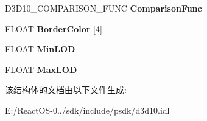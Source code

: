 \begin{DoxyCompactItemize}
D3\+D10\+\_\+\+C\+O\+M\+P\+A\+R\+I\+S\+O\+N\+\_\+\+F\+U\+NC {\bfseries Comparison\+Func}
\item 
\mbox{\label{struct_d3_d10___s_a_m_p_l_e_r___d_e_s_c_ab23ac77c31d4f36c23267bb166c38543}} 
F\+L\+O\+AT {\bfseries Border\+Color} \mbox{[}4\mbox{]}
\item 
\mbox{\label{struct_d3_d10___s_a_m_p_l_e_r___d_e_s_c_a43d36497b1deb0064289493c8349e646}} 
F\+L\+O\+AT {\bfseries Min\+L\+OD}
\item 
\mbox{\label{struct_d3_d10___s_a_m_p_l_e_r___d_e_s_c_ae0eaf76ee629bb8a2765fa8ce2234636}} 
F\+L\+O\+AT {\bfseries Max\+L\+OD}
\end{DoxyCompactItemize}


该结构体的文档由以下文件生成\+:\begin{DoxyCompactItemize}
\item 
E\+:/\+React\+O\+S-\/0../sdk/include/psdk/d3d10.\+idl\end{DoxyCompactItemize}
